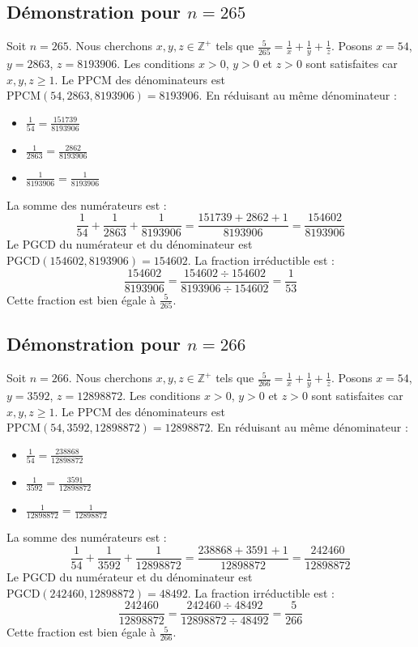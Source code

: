 \documentclass[11pt,a4paper]{article}
\begin{document}
\subsection{Démonstration pour $n = 265$}
Soit $n = 265$. Nous cherchons $x, y, z \in \mathbb{Z}^{+}$ tels que $\frac{5}{265} = \frac{1}{x} + \frac{1}{y} + \frac{1}{z}$.
Posons $x = 54$, $y = 2863$, $z = 8193906$.
Les conditions $x > 0$, $y > 0$ et $z > 0$ sont satisfaites car $x, y, z \geq 1$.
Le PPCM des dénominateurs est $\text{PPCM}(54, 2863, 8193906) = 8193906$.
En réduisant au même dénominateur :
\begin{itemize}
    \item $\frac{1}{54} = \frac{151739}{8193906}$
    \item $\frac{1}{2863} = \frac{2862}{8193906}$
    \item $\frac{1}{8193906} = \frac{1}{8193906}$
\end{itemize}
La somme des numérateurs est :
$$ \frac{1}{54} + \frac{1}{2863} + \frac{1}{8193906} = \frac{151739 + 2862 + 1}{8193906} = \frac{154602}{8193906} $$
Le PGCD du numérateur et du dénominateur est $\text{PGCD}(154602, 8193906) = 154602$.
La fraction irréductible est :
$$ \frac{154602}{8193906} = \frac{154602 \div 154602}{8193906 \div 154602} = \frac{1}{53} $$
Cette fraction est bien égale à $\frac{5}{265}$.

\subsection{Démonstration pour $n = 266$}
Soit $n = 266$. Nous cherchons $x, y, z \in \mathbb{Z}^{+}$ tels que $\frac{5}{266} = \frac{1}{x} + \frac{1}{y} + \frac{1}{z}$.
Posons $x = 54$, $y = 3592$, $z = 12898872$.
Les conditions $x > 0$, $y > 0$ et $z > 0$ sont satisfaites car $x, y, z \geq 1$.
Le PPCM des dénominateurs est $\text{PPCM}(54, 3592, 12898872) = 12898872$.
En réduisant au même dénominateur :
\begin{itemize}
    \item $\frac{1}{54} = \frac{238868}{12898872}$
    \item $\frac{1}{3592} = \frac{3591}{12898872}$
    \item $\frac{1}{12898872} = \frac{1}{12898872}$
\end{itemize}
La somme des numérateurs est :
$$ \frac{1}{54} + \frac{1}{3592} + \frac{1}{12898872} = \frac{238868 + 3591 + 1}{12898872} = \frac{242460}{12898872} $$
Le PGCD du numérateur et du dénominateur est $\text{PGCD}(242460, 12898872) = 48492$.
La fraction irréductible est :
$$ \frac{242460}{12898872} = \frac{242460 \div 48492}{12898872 \div 48492} = \frac{5}{266} $$
Cette fraction est bien égale à $\frac{5}{266}$.
\end{document}
